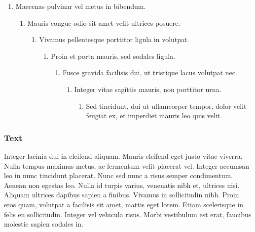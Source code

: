 \documentclass{article}
\begin{document}
\begin{enumerate}
\item Maecenas pulvinar vel metus in bibendum. 

\begin{enumerate}
\item Mauris congue odio sit amet velit ultrices posuere. 

\begin{enumerate}
\item Vivamus pellentesque porttitor ligula in volutpat. 

\begin{enumerate}
\item Proin et porta mauris, sed sodales ligula. 

\begin{enumerate}
\item Fusce gravida facilisis dui, ut tristique lacus volutpat nec.

\begin{enumerate}
\item  Integer vitae sagittis mauris, non porttitor urna. 

\begin{enumerate}
\item Sed tincidunt, dui ut ullamcorper tempor, dolor velit feugiat ex, et imperdiet mauris leo quis velit. 


\end{enumerate}

\end{enumerate}

\end{enumerate}

\end{enumerate}

\end{enumerate}

\end{enumerate}

\end{enumerate}

\subsubsection{Text}\label{H1635418}



Integer lacinia dui in eleifend aliquam. Mauris eleifend eget justo vitae viverra. Nulla tempus maximus metus, ac fermentum velit placerat vel. Integer accumsan leo in nunc tincidunt placerat. Nunc sed nunc a risus semper condimentum. Aenean non egestas leo. Nulla id turpis varius, venenatis nibh et, ultrices nisi. Aliquam ultrices dapibus sapien a finibus. Vivamus in sollicitudin nibh. Proin eros quam, volutpat a facilisis sit amet, mattis eget lorem. Etiam scelerisque in felis eu sollicitudin. Integer vel vehicula risus. Morbi vestibulum est erat, faucibus molestie sapien sodales in.
\end{document}
